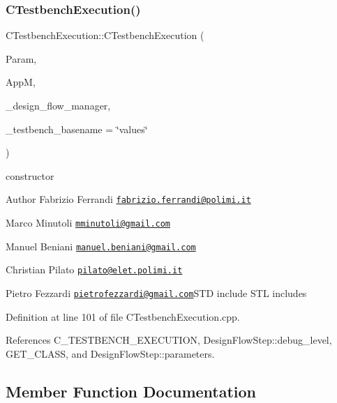 \subsubsection{\texorpdfstring{C\+Testbench\+Execution()}{CTestbenchExecution()}}
{\footnotesize\ttfamily C\+Testbench\+Execution\+::\+C\+Testbench\+Execution (\begin{DoxyParamCaption}\item[{const \hyperlink{Parameter_8hpp_a37841774a6fcb479b597fdf8955eb4ea}{Parameter\+Const\+Ref}}]{Param,  }\item[{const \hyperlink{hls__manager_8hpp_acd3842b8589fe52c08fc0b2fcc813bfe}{H\+L\+S\+\_\+manager\+Ref}}]{AppM,  }\item[{const Design\+Flow\+Manager\+Const\+Ref}]{\+\_\+design\+\_\+flow\+\_\+manager,  }\item[{const std\+::string \&}]{\+\_\+testbench\+\_\+basename = {\ttfamily \char`\"{}values\char`\"{}} }\end{DoxyParamCaption})}



constructor 

\begin{DoxyAuthor}{Author}
Fabrizio Ferrandi \href{mailto:fabrizio.ferrandi@polimi.it}{\tt fabrizio.\+ferrandi@polimi.\+it} 

Marco Minutoli \href{mailto:mminutoli@gmail.com}{\tt mminutoli@gmail.\+com} 

Manuel Beniani \href{mailto:manuel.beniani@gmail.com}{\tt manuel.\+beniani@gmail.\+com} 

Christian Pilato \href{mailto:pilato@elet.polimi.it}{\tt pilato@elet.\+polimi.\+it} 

Pietro Fezzardi \href{mailto:pietrofezzardi@gmail.com}{\tt pietrofezzardi@gmail.\+com}S\+TD include S\+TL includes 
\end{DoxyAuthor}


Definition at line 101 of file C\+Testbench\+Execution.\+cpp.



References C\+\_\+\+T\+E\+S\+T\+B\+E\+N\+C\+H\+\_\+\+E\+X\+E\+C\+U\+T\+I\+ON, Design\+Flow\+Step\+::debug\+\_\+level, G\+E\+T\+\_\+\+C\+L\+A\+SS, and Design\+Flow\+Step\+::parameters.



\subsection{Member Function Documentation}
\mbox{\label{classCTestbenchExecution_afcca0fd1ecbe9fe41b06a405be0ad67c}} 
